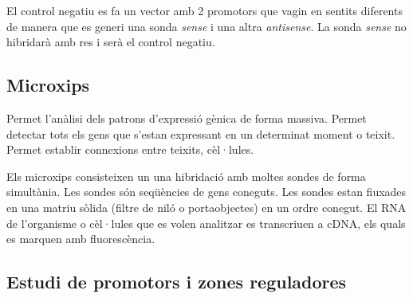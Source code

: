 El control negatiu es fa un vector amb 2 promotors que vagin en
sentits diferents de manera que es generi una sonda \textit{sense} i
una altra \textit{antisense}. La sonda \textit{sense} no hibridarà amb
res i serà el control negatiu.

\subsection{Microxips}
\label{sec:microxips}
Permet l'anàlisi dels patrons d'expressió gènica de forma
massiva. Permet detectar tots els gens que s'estan expressant en un
determinat moment o teixit. Permet establir connexions entre teixits,
cèl·lules.

Els microxips consisteixen un una hibridació amb moltes sondes de
forma simultània. Les sondes són seqüències de gens coneguts. Les
sondes estan fiuxades en una matriu sòlida (filtre de niló o
portaobjectes) en un ordre conegut. El RNA de l'organisme o cèl·lules
que es volen analitzar es transcriuen a cDNA, els quals es marquen amb
fluorescència.

\subsection{Estudi de promotors i zones reguladores}
\label{sec:estudi-de-zones}
